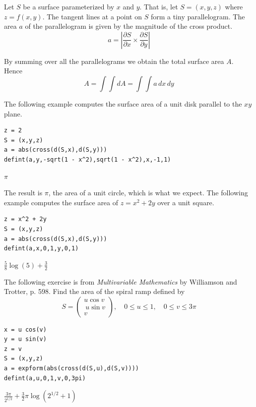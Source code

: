 \documentclass[12pt]{article}
\begin{document}
Let $S$ be a surface parameterized by $x$ and $y$.
That is, let $S=(x,y,z)$ where $z=f(x,y)$.
The tangent lines at a point on $S$ form a tiny parallelogram.
The area $a$ of the parallelogram is given by the magnitude of the cross product.
\begin{equation*}
a=\left|\frac{\partial S}{\partial x}\times\frac{\partial S}{\partial y}\right|
\end{equation*}

By summing over all the parallelograms we obtain the total surface area $A$.
Hence
\begin{equation*}
A=\int\int dA=\int\int a\,dx\,dy
\end{equation*}

The following example computes the surface area of a unit disk
parallel to the $xy$ plane.

{\color{blue}
\begin{verbatim}
z = 2
S = (x,y,z)
a = abs(cross(d(S,x),d(S,y)))
defint(a,y,-sqrt(1 - x^2),sqrt(1 - x^2),x,-1,1)
\end{verbatim}
}

$\displaystyle \pi$

\bigskip
The result is $\pi$, the area of a unit circle, which is what we expect.
The following example computes the surface area of $z=x^2+2y$ over
a unit square.

{\color{blue}
\begin{verbatim}
z = x^2 + 2y
S = (x,y,z)
a = abs(cross(d(S,x),d(S,y)))
defint(a,x,0,1,y,0,1)
\end{verbatim}
}

$\displaystyle \tfrac{5}{8}\log(5)+\tfrac{3}{2}$

\bigskip
The following exercise is from
{\it Multivariable Mathematics} by Williamson and Trotter, p. 598.
Find the area of the spiral ramp defined by
\begin{equation*}
S=\begin{pmatrix}u\cos v\\\ u\sin v\\ v\end{pmatrix},\quad 0\le u\le1,\quad 0\le v\le3\pi
\end{equation*}

{\color{blue}
\begin{verbatim}
x = u cos(v)
y = u sin(v)
z = v
S = (x,y,z)
a = expform(abs(cross(d(S,u),d(S,v))))
defint(a,u,0,1,v,0,3pi)
\end{verbatim}
}

$\displaystyle \frac{3\pi}{2^{1/2}}+\tfrac{3}{2}\pi\log\left(2^{1/2}+1\right)$
\end{document}
